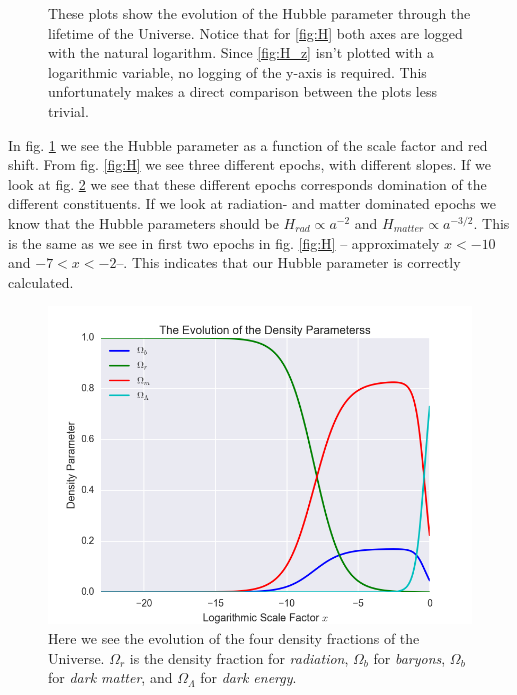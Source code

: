 \documentclass[a4paper,norsk, 10pt]{article}
\begin{document}
\begin{figure}[ht]
     \caption{These plots show the evolution of the Hubble parameter through the lifetime of the Universe. Notice that for \ref{fig:H} both axes are logged with the natural logarithm. Since \ref{fig:H_z} isn't plotted with a logarithmic variable, no logging of the y-axis is required. This unfortunately makes a direct comparison between the plots less trivial.}
     \label{fig:Hs}
  
\end{figure}



In fig. \ref{fig:Hs} we see the Hubble parameter as a function of the scale factor and red shift. From fig. \ref{fig:H} we see three different epochs, with different slopes. If we look at fig. \ref{fig:omega} we see that these different epochs corresponds domination of the different constituents. If we look at radiation- and matter dominated epochs we know that the Hubble parameters should be $H_{rad} \propto a^{-2}$ and $H_{matter} \propto a^{-3/2}$. This is the same as we see in first two epochs in fig. \ref{fig:H} -- approximately $x < -10$ and $-7<x<-2$--. This indicates that our Hubble parameter is correctly calculated.


\begin{figure}[ht]
     \centering
	{\includegraphics[scale=0.5]{Omega.png}
	\caption{Here we see the evolution of the four density fractions of the Universe. $\Omega_r$ is the density fraction for \textit{radiation}, $\Omega_b$ for \textit{baryons}, $\Omega_b$ for \textit{dark matter}, and $\Omega_{\Lambda}$ for \textit{dark energy}.}\label{fig:omega}}
\end{figure}
\end{document}
